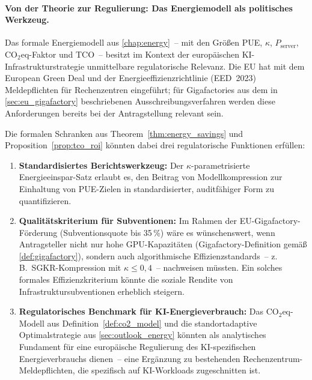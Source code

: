 ﻿\documentclass[12pt, a4paper, openany]{report}
\begin{document}
\paragraph{Von der Theorie zur Regulierung: Das Energiemodell als
  politisches Werkzeug.}
Das formale Energiemodell aus \cref{chap:energy}~-- mit den Größen
PUE, $\kappa$, $P_{\mathrm{server}}$, CO$_2$eq-Faktor und TCO~--
besitzt im Kontext der europäischen KI-Infrastrukturstrategie
unmittelbare regulatorische Relevanz.  Die EU hat mit dem European
Green Deal und der Energieeffizienzrichtlinie (EED~2023) Meldepflichten
für Rechenzentren eingeführt; für Gigafactories aus dem in
\cref{sec:eu_gigafactory} beschriebenen Ausschreibungsverfahren werden
diese Anforderungen bereits bei der Antragstellung relevant sein.

Die formalen Schranken aus Theorem~\ref{thm:energy_savings} und
Proposition~\ref{prop:tco_roi} könnten dabei drei regulatorische
Funktionen erfüllen:
\begin{enumerate}[label=(\roman*)]
  \item \textbf{Standardisiertes Berichtswerkzeug:} Der
    $\kappa$-parametrisierte Energieeinspar-Satz erlaubt es, den
    Beitrag von Modellkompression zur Einhaltung von PUE-Zielen in
    standardisierter, auditfähiger Form zu quantifizieren.
  \item \textbf{Qualitätskriterium für Subventionen:} Im Rahmen der
    EU-Gigafactory-Förderung (Subventionsquote bis 35\,\%) wäre es
    wünschenswert, wenn Antragsteller nicht nur hohe GPU-Kapazitäten
    (Gigafactory-Definition gemäß \cref{def:gigafactory}), sondern auch
    algorithmische Effizienzstandards~-- z.\,B.\ SGKR-Kompression mit
    $\kappa \leq 0{,}4$~-- nachweisen müssten.  Ein solches formales
    Effizienzkriterium könnte die soziale Rendite von
    Infrastruktursubventionen erheblich steigern.
  \item \textbf{Regulatorisches Benchmark für KI-Energieverbrauch:}
    Das CO$_2$eq-Modell aus Definition~\ref{def:co2_model} und die
    standortadaptive Optimalstrategie aus \cref{sec:outlook_energy}
    könnten als analytisches Fundament für eine europäische
    Regulierung des KI-spezifischen Energieverbrauchs dienen~-- eine
    Ergänzung zu bestehenden Rechenzentrum-Meldepflichten, die
    spezifisch auf KI-Workloads zugeschnitten ist.
\end{enumerate}
\end{document}
